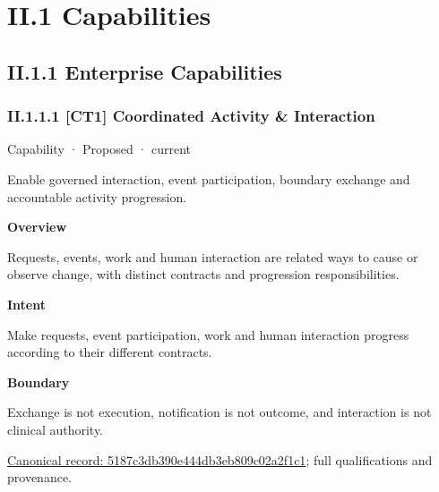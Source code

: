 \chapter*{II.1 Capabilities}
\label{navigation:II.1}

\section*{II.1.1 Enterprise Capabilities}
\label{navigation:II.1.1}

\subsection*{II.1.1.1 [CT1] Coordinated Activity \& Interaction}
\label{navigation:II.1.1.1}

\label{element:5187c3db390e444db3eb809c02a2f1c1}
{\small Capability · Proposed · current}\par

Enable governed interaction, event participation, boundary exchange and accountable activity progression.



\textbf{Overview}



Requests, events, work and human interaction are related ways to cause or observe change, with distinct contracts and progression responsibilities.



\textbf{Intent}



Make requests, event participation, work and human interaction progress according to their different contracts.



\textbf{Boundary}



Exchange is not execution, notification is not outcome, and interaction is not clinical authority.


{\footnotesize \href{../../../../../../../continuum/strategy/capability/5187c3db390e444db3eb809c02a2f1c1.md}{Canonical record: 5187c3db390e444db3eb809c02a2f1c1}; full qualifications and provenance.}\par
